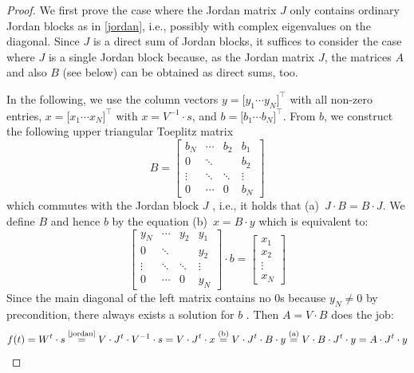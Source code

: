 \documentclass[twoside,11pt]{article}
\theoremstyle{definition}
\begin{document}
\begin{proof}
We first prove the case where the Jordan matrix $J$ only contains ordinary
Jordan blocks as in \cref{jordan}, i.e., possibly with complex eigenvalues
on the diagonal. Since $J$ is a direct sum of Jordan blocks, it suffices to
consider the case where $J$ is a single Jordan block because, as the Jordan
matrix $J$, the matrices $A$ and also $B$ (see below) can be obtained as direct
sums, too.

In the following, we use the column vectors $y = \big[ y_1 \cdots y_N
\big]^\top$ with all non-zero entries, $x = \big[ x_1 \cdots x_N \big]^\top$
with $x = V^{-1} \cdot s$, and $b = \big[ b_1 \cdots b_N \big]^\top$. From $b$,
we construct the following upper triangular Toeplitz matrix
\[ B = \left[ \begin{array}{*{4}{c}}
  b_N & \cdots & b_2 & b_1\\
  0 & \ddots & & b_2\\
  \vdots & \ddots & \ddots & \vdots\\
  0 & \cdots & 0 & b_N
\end{array} \right] \]
which commutes with the Jordan block $J$ \cite[Sect.~3.2.4]{HJ13}, i.e., it
holds that (a)~$J \cdot B = B \cdot J$. We define $B$ and hence $b$ by the
equation (b)~$x = B \cdot y$ which is
equivalent to:
\[ \left[ \begin{array}{*{4}{c}}
  y_N & \cdots & y_2 & y_1\\
  0 & \ddots & & y_2\\
  \vdots & \ddots & \ddots & \vdots\\
  0 & \cdots & 0 & y_N
\end{array} \right] \cdot b = \left[ \begin{array}{c}
  x_1\\[7pt] x_2\\ \vdots\\ x_N
\end{array} \right] \]
Since the main diagonal of the left matrix contains no $0$s because $y_N \neq 0$
by precondition, there always exists a solution for $b$ \cite[Sect.~0.9.3]{HJ13}.
Then $A = V \cdot B$ does the job:
\[ f(t) = W^t \cdot s
	\overset{\textrm{\cref{jordan}}}{=} V \cdot J^t \cdot V^{-1} \cdot s
	= V \cdot J^t \cdot x
	\overset{\textrm{(b)}}{=} V \cdot J^t \cdot B \cdot y
	\overset{\textrm{(a)}}{=} V \cdot B \cdot J^t \cdot y
	= A \cdot J^t \cdot y
\]


\end{proof}
\end{document}
